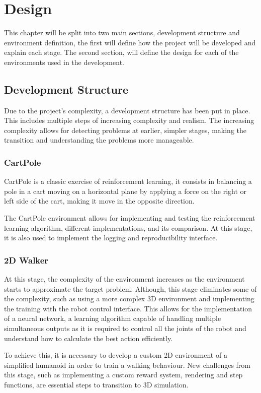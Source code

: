 \chapter{Design}
This chapter will be split into two main sections, development structure and environment definition, the first will define how the project will be developed and explain each stage. 
The second section, will define the design for each of the environments used in the development.
\section{Development Structure}
Due to the project's complexity, a development structure has been put in place. This includes multiple steps of increasing complexity and realism. The increasing complexity allows for detecting problems at earlier, simpler stages, making the transition and understanding the problems more manageable.
\subsection{CartPole}
CartPole is a classic exercise of reinforcement learning, it consists in balancing a pole in a cart moving on a horizontal plane by applying a force on the right or left side of the cart, making it move in the opposite direction. 

The CartPole environment allows for implementing and testing the reinforcement learning algorithm, different implementations, and its comparison. At this stage, it is also used to implement the logging and reproducibility interface.

\subsection{2D Walker}
At this stage, the complexity of the environment increases as the environment starts to approximate the target problem. Although, this stage eliminates some of the complexity, such as using a more complex 3D environment and implementing the training with the robot control interface.
This allows for the implementation of a neural network, a learning algorithm capable of handling multiple simultaneous outputs as it is required to control all the joints of the robot and understand how to calculate the best action efficiently.

To achieve this, it is necessary to develop a custom 2D environment of a simplified humanoid in order to train a walking behaviour.
New challenges from this stage, such as implementing a custom reward system, rendering and step functions, are essential steps to transition to 3D simulation.


